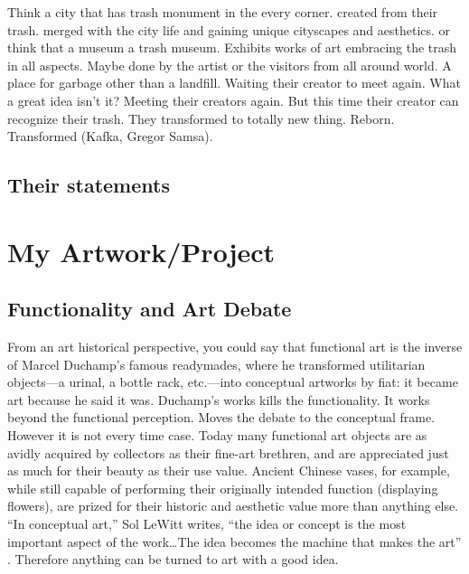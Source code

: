 \documentclass[12pt]{article}
\providecommand{\quotes}[1]{``#1''}
\begin{document}
Think a city that has trash monument in the every corner. created from their trash. merged with the city life and gaining unique cityscapes and aesthetics. or think that a museum a trash museum. Exhibits works of art embracing the trash in all aspects. Maybe done by the artist or the visitors from all around world. A place for garbage other than a landfill. Waiting their creator to meet again. What a great idea isn't it? Meeting their creators again. But this time their creator can recognize their trash. They transformed to totally new thing. Reborn. Transformed (Kafka, Gregor Samsa).

\subsection{Their statements}

\section{My Artwork/Project}

\subsection{Functionality and Art Debate}
From an art historical perspective, you could say that functional art is the inverse of Marcel Duchamp's famous readymades, where he transformed utilitarian objects---a urinal, a bottle rack, etc.---into conceptual artworks by fiat: it became art because he said it was. Duchamp's works kills the functionality. It works beyond the functional perception. Moves the debate to the conceptual frame. However it is not every time case. Today many functional art objects are as avidly acquired by collectors as their fine-art brethren, and are appreciated just as much for their beauty as their use value. Ancient Chinese vases, for example, while still capable of performing their originally intended function (displaying flowers), are prized for their historic and aesthetic value more than anything else. \quotes{In conceptual art,} Sol LeWitt writes, \quotes{the idea or concept is the most important aspect of the work\ldots The idea becomes the machine that makes the art} \cite{lewitt1967paragraphs}. Therefore anything can be turned to art with a good idea. 
\end{document}

